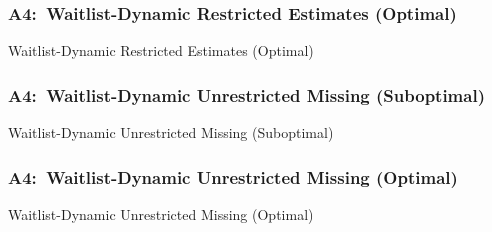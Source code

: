 \documentclass[12pt, aspectratio=169]{beamer}
\begin{document}
\begin{frame}[label=wdreo]
\frametitle{A4:\ Waitlist-Dynamic Restricted Estimates (Optimal)}
\addtocounter{framenumber}{-1}
\begin{table}[htbp]
  \centering
  \addtocounter{table}{-1}
  \renewcommand{\thetable}{\arabic{table}b}
  \caption{Waitlist-Dynamic Restricted Estimates (Optimal)}
  \vspace{5pt}
  \begin{adjustbox}{totalheight=.7\textheight}

  \end{adjustbox}
\end{table}%
\hyperlink{wdueo}{}
\end{frame}

\begin{frame}[label=wdums]
\frametitle{A4:\ Waitlist-Dynamic Unrestricted Missing (Suboptimal)}
\begin{table}[htbp]
  \centering
  \renewcommand{\thetable}{\arabic{table}a}
  \caption{Waitlist-Dynamic Unrestricted Missing (Suboptimal)}
  \vspace{5pt}
  \begin{adjustbox}{totalheight=.7\textheight}

  \end{adjustbox}
\end{table}%
\hyperlink{wdues}{}
\end{frame}

\begin{frame}[label=wdumo]
\frametitle{A4:\ Waitlist-Dynamic Unrestricted Missing (Optimal)}
\addtocounter{framenumber}{-1}
\begin{table}[htbp]
  \centering
  \addtocounter{table}{-1}
  \renewcommand{\thetable}{\arabic{table}b}
  \caption{Waitlist-Dynamic Unrestricted Missing (Optimal)}
  \vspace{5pt}
  \begin{adjustbox}{totalheight=.7\textheight}

  \end{adjustbox}
\end{table}%
\hyperlink{wdueo}{}
\end{frame}
\end{document}
